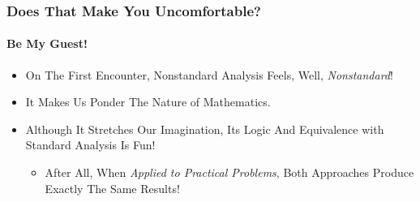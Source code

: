 \begin{frame}
\frametitle{Does That Make You Uncomfortable?}
\framesubtitle{Be My Guest!}
\label{slide:uncomfortable}
\begin{itemize}
\pause
\item On The First Encounter, \alert{Nonstandard Analysis Feels, Well, \textit{Nonstandard}}!
\pause
\item It Makes Us \alert{Ponder The Nature of Mathematics}.
\pause
\item Although It Stretches Our Imagination, Its Logic And Equivalence with Standard Analysis Is \alert{Fun}!
\begin{itemize}
\pause
\item After All, When \textit{Applied to Practical Problems}, Both Approaches \alert{Produce Exactly The Same Results}!
\end{itemize}
\end{itemize}
\end{frame}

